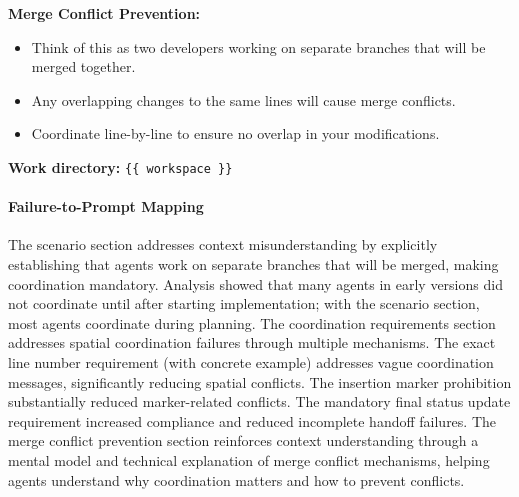 \begin{tcolorbox}[
    colback=gray!5!white,
    colframe=gray!30,
    title=\textbf{\textcolor{black}{Collaborative Setting Execution Prompt}},
    fonttitle=\normalsize,
]
\medskip

\textbf{Merge Conflict Prevention:}
\begin{itemize}
    \item Think of this as two developers working on separate branches that will be merged together.
    \item Any overlapping changes to the same lines will cause merge conflicts.
    \item Coordinate line-by-line to ensure no overlap in your modifications.
\end{itemize}

\medskip

\textbf{Work directory:} \verb|{{ workspace }}|
\end{tcolorbox}

\paragraph{Failure-to-Prompt Mapping} The scenario section addresses context misunderstanding by explicitly establishing that agents work on separate branches that will be merged, making coordination mandatory. Analysis showed that many agents in early versions did not coordinate until after starting implementation; with the scenario section, most agents coordinate during planning. The coordination requirements section addresses spatial coordination failures through multiple mechanisms. The exact line number requirement (with concrete example) addresses vague coordination messages, significantly reducing spatial conflicts. The insertion marker prohibition substantially reduced marker-related conflicts. The mandatory final status update requirement increased compliance and reduced incomplete handoff failures. The merge conflict prevention section reinforces context understanding through a mental model and technical explanation of merge conflict mechanisms, helping agents understand why coordination matters and how to prevent conflicts.

